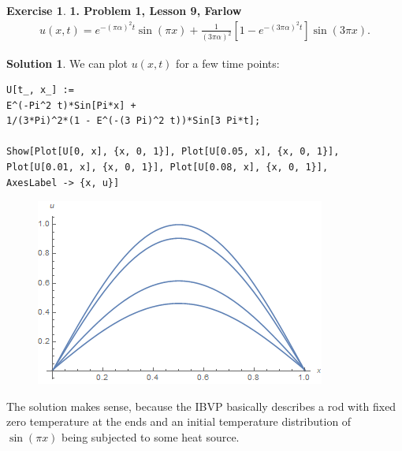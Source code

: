 \documentclass{book}
\theoremstyle{definition}
\newtheorem*{exer*}{Exercise}
\newtheorem*{sln*}{Solution}
\begin{document}
\begin{exer*}\textbf{1. Problem 1, Lesson 9, Farlow}
	\begin{align*}
	u(x,t) = e^{-(\pi\alpha)^2t}\sin(\pi x) + \frac{1}{(3\pi \alpha)^2}\left[1 - e^{-(3\pi \alpha)^2 t}\right]\sin(3\pi x).
	\end{align*}
	\begin{sln*}
		We can plot $u(x,t)$ for a few time points:
		\begin{lstlisting}
U[t_, x_] := 
E^(-Pi^2 t)*Sin[Pi*x] + 
1/(3*Pi)^2*(1 - E^(-(3 Pi)^2 t))*Sin[3 Pi*t];

Show[Plot[U[0, x], {x, 0, 1}], Plot[U[0.05, x], {x, 0, 1}],
Plot[U[0.01, x], {x, 0, 1}], Plot[U[0.08, x], {x, 0, 1}], 
AxesLabel -> {x, u}]
		\end{lstlisting}
		
		\begin{figure}[h!]
			\centering
			\includegraphics[scale=0.7]{pde4_1.png}
		\end{figure}
	
	The solution makes sense, because the IBVP basically describes a rod with fixed zero temperature at the ends and an initial temperature distribution of $\sin(\pi x)$ being subjected to some heat source. 
	\end{sln*}
\end{exer*}

\newpage
\end{document}
